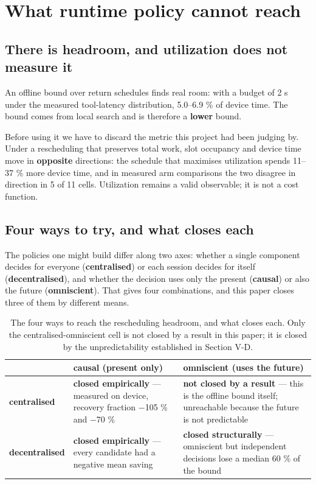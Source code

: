
\section{What runtime policy cannot reach}
\label{sec:05}

\subsection{There is headroom, and utilization does not measure it}

An offline bound over return schedules finds real room: with a budget of 2 s under the measured tool-latency distribution, 5.0--6.9 \% of device time. The bound comes from local search and is therefore a \textbf{lower} bound.

Before using it we have to discard the metric this project had been judging by. Under a rescheduling that preserves total work, slot occupancy and device time move in \textbf{opposite} directions: the schedule that maximises utilization spends 11--37 \% more device time, and in measured arm comparisons the two disagree in direction in 5 of 11 cells. Utilization remains a valid observable; it is not a cost function.

\subsection{Four ways to try, and what closes each}

The policies one might build differ along two axes: whether a single component decides for everyone (\textbf{centralised}) or each session decides for itself (\textbf{decentralised}), and whether the decision uses only the present (\textbf{causal}) or also the future (\textbf{omniscient}). That gives four combinations, and this paper closes three of them by different means.


\begin{table}[t]
  \centering
  \caption{The four ways to reach the rescheduling headroom, and what closes each. Only the centralised-omniscient cell is not closed by a result in this paper; it is closed by the unpredictability established in Section V-D.}
  \label{tab:twobytwo}
  \footnotesize
  \begin{tabular}{p{1.5cm}p{3.0cm}p{3.0cm}}
    \toprule
     & causal (present only) & omniscient (uses the future) \\
    \midrule
    \textbf{centralised} & \textbf{closed empirically} --- measured on device, recovery fraction $-$105 \% and $-$70 \% & \textbf{not closed by a result} --- this is the offline bound itself; unreachable because the future is not predictable \\
    \textbf{decentralised} & \textbf{closed empirically} --- every candidate had a negative mean saving & \textbf{closed structurally} --- omniscient but independent decisions lose a median 60 \% of the bound \\
    \bottomrule
  \end{tabular}
\end{table}

